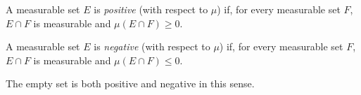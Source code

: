 A measurable set $E$ is \textit{positive} (with respect to $\mu$) if, for every measurable set $F$, $E \cap F$ is measurable and $\mu(E \cap F) \geq 0$.

A measurable set $E$ is \textit{negative} (with respect to $\mu$) if, for every measurable set $F$, $E \cap F$ is measurable and $\mu(E \cap F) \leq 0$.

The empty set is both positive and negative in this sense.

